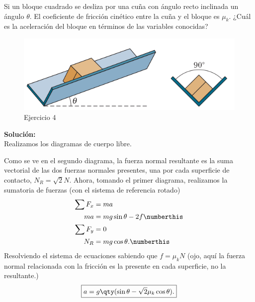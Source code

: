 
















\begin{mdframed}[style=warning]
	\begin{ejercicio}
		Si un bloque cuadrado se desliza por una cuña con ángulo recto inclinada un ángulo $\theta$. El coeficiente de fricción cinético entre la cuña y el bloque es $\mu _k$. ¿Cuál es la aceleración del bloque en términos de las variables conocidas?
		\begin{figure}[H]
			\centering
			\includegraphics[scale=0.3]{./img/cuna.png}
			\caption{Ejercicio 4}
		\end{figure}
	\end{ejercicio}
	\noindent \textbf{Solución: } \\
	Realizamos los diagramas de cuerpo libre.
	\begin{center}
		
		\vspace{0.5cm}
		
	\end{center}
	Como se ve en el segundo diagrama, la fuerza normal resultante es la suma vectorial de las dos fuerzas normales presentes, una por cada superficie de contacto, $N_R = \sqrt{2} N$. Ahora, tomando el primer diagrama, realizamos la sumatoria de fuerzas (con el sistema de referencia rotado)
		\begin{align*}
			\sum F_x &= ma \\
			ma &= mg\sin{\theta} - 2f \numberthis \label{ej4_dcl_x} \\
			\sum F_y &= 0 \\
			N_R &= mg\cos{\theta}. \numberthis \label{ej4_dcl_y}
		\end{align*}
	Resolviendo el sistema de ecuaciones sabiendo que $f = \mu _k N$ (ojo, aquí la fuerza normal relacionada con la fricción es la presente en cada superficie, no la resultante.)
		$$ \boxed{ a = g\qty(\sin{\theta} - \sqrt{2} \mu _k \cos{\theta}). } $$
\end{mdframed}








